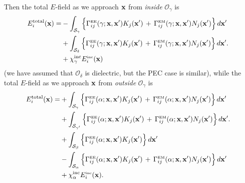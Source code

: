 \documentclass[dvips,letterpaper]{article}
\begin{document}
Then the total $E$-field as we approach $\mathbf{x}$ from 
\textit{inside} $\mathcal{O}_\gamma$ is 
\begin{align} 
E^{\hbox{\scriptsize{total}}}_i(\mathbf{x}) 
    = &-\int_{\mathcal{S}_\gamma} 
           \Big\{ \Gamma_{ij}^{\hbox{\tiny{EE}}}(\gamma; \mathbf{x}, \mathbf{x}^\prime) 
                   K_j(\mathbf{x}^\prime)
                  \,+\,
                   \Gamma_{ij}^{\hbox{\tiny{EM}}}(\gamma; \mathbf{x}, \mathbf{x}^\prime) 
                   N_j(\mathbf{x}^\prime)
           \Big\} \, d\mathbf{x}^\prime
\nonumber \\
     &+\int_{\mathcal{S}_\delta}
           \Big\{ \Gamma_{ij}^{\hbox{\tiny{EE}}}(\gamma; \mathbf{x}, \mathbf{x}^\prime) 
                   K_j(\mathbf{x}^\prime)
                  \,+\,
                   \Gamma_{ij}^{\hbox{\tiny{EM}}}(\gamma; \mathbf{x}, \mathbf{x}^\prime) 
                   N_j(\mathbf{x}^\prime)
           \Big\} \, d\mathbf{x}^\prime.
\nonumber \\
     &+\chi^{\hbox{\scriptsize{inc}}}_\gamma E_i^{\hbox{\tiny{inc}}}(\mathbf{x})
\label{FieldInsideDielectric}
\end{align}
(we have assumed that $\mathcal{O}_\delta$ is dielectric, but 
the PEC case is similar), while the 
total $E$-field as we approach $\mathbf{x}$ from \textit{outside} 
$\mathcal{O}_\gamma$ is 
\begin{align} 
E^{\hbox{\scriptsize{total}}}_i(\mathbf{x}) 
    = &+\int_{\mathcal{S}_\gamma} 
           \Big\{ \Gamma_{ij}^{\hbox{\tiny{EE}}}(\alpha; \mathbf{x}, \mathbf{x}^\prime) 
                   K_j(\mathbf{x}^\prime)
                  \,+\,
                   \Gamma_{ij}^{\hbox{\tiny{EM}}}(\alpha; \mathbf{x}, \mathbf{x}^\prime) 
                   N_j(\mathbf{x}^\prime)
           \Big\} \, d\mathbf{x}^\prime
\nonumber \\
     &+\int_{\mathcal{S}_{\gamma^\prime}}
           \Big\{ \Gamma_{ij}^{\hbox{\tiny{EE}}}(\alpha; \mathbf{x}, \mathbf{x}^\prime) 
                   K_j(\mathbf{x}^\prime)
                  \,+\,
                   \Gamma_{ij}^{\hbox{\tiny{EM}}}(\alpha; \mathbf{x}, \mathbf{x}^\prime) 
                   N_j(\mathbf{x}^\prime)
           \Big\} \, d\mathbf{x}^\prime.
\nonumber \\
     &+\int_{\mathcal{S}_{\beta}}
           \Big\{ \Gamma_{ij}^{\hbox{\tiny{EE}}}(\alpha; \mathbf{x}, \mathbf{x}^\prime) 
                   K_j(\mathbf{x}^\prime)
           \Big\} \, d\mathbf{x}^\prime
\nonumber \\
     &-\int_{\mathcal{S}_{\alpha}}
           \Big\{ \Gamma_{ij}^{\hbox{\tiny{EE}}}(\alpha; \mathbf{x}, \mathbf{x}^\prime) 
                   K_j(\mathbf{x}^\prime)
                  \,+\,
                   \Gamma_{ij}^{\hbox{\tiny{EM}}}(\alpha; \mathbf{x}, \mathbf{x}^\prime) 
                   N_j(\mathbf{x}^\prime)
           \Big\} \, d\mathbf{x}^\prime
\nonumber \\
     &+\chi^{\hbox{\scriptsize{inc}}}_\alpha E_i^{\hbox{\tiny{inc}}}(\mathbf{x}).
\label{FieldOutsideDielectric}
\end{align}
\end{document}
